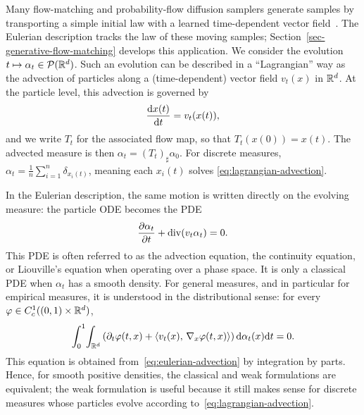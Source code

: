 Many flow-matching and probability-flow diffusion samplers generate samples by transporting a simple initial law with a learned time-dependent vector field~\cite{Lipman2022FlowMatching,Song2021ScoreSDE}. The Eulerian description tracks the law of these moving samples; Section~\ref{sec-generative-flow-matching} develops this application. We consider the evolution $t \mapsto \alpha_t \in \mathcal{P}(\mathbb{R}^d)$. Such an evolution can be described in a ``Lagrangian'' way as the advection of particles along a (time-dependent) vector field $v_t(x)$ in $\mathbb{R}^d$. At the particle level, this advection is governed by
\begin{equation}
    \frac{\mathrm{d} x(t)}{\mathrm{d} t} = v_t(x(t)), \label{eq:lagrangian-advection}
\end{equation}
and we write $T_t$ for the associated flow map, so that $T_t(x(0))=x(t)$. The advected measure is then $\alpha_t = (T_t)_\sharp \alpha_0$. For discrete measures, $\alpha_t = \frac{1}{n} \sum_{i=1}^n \delta_{x_i(t)}$, meaning each $x_i(t)$ solves \eqref{eq:lagrangian-advection}.

In the Eulerian description, the same motion is written directly on the evolving measure: the particle ODE becomes the PDE
\begin{equation}
    \frac{\partial \alpha_t}{\partial t} + \operatorname{div}(v_t \alpha_t) = 0. \label{eq:eulerian-advection}
\end{equation}
This PDE is often referred to as the advection equation, the continuity equation, or Liouville's equation when operating over a phase space. It is only a classical PDE when $\alpha_t$ has a smooth density. For general measures, and in particular for empirical measures, it is understood in the distributional sense: for every $\varphi\in C_c^1((0,1)\times\mathbb{R}^d)$,
\begin{equation}\label{eq:eulerian-advection-weak}
	\int_0^1\!\int_{\mathbb{R}^d}
	\left(\partial_t\varphi(t,x)+\langle v_t(x),\,\nabla_x\varphi(t,x)\rangle\right)
	\mathrm{d}\alpha_t(x)\mathrm{d} t
	=
	0.
\end{equation}
This equation is obtained from~\eqref{eq:eulerian-advection} by integration by parts. Hence, for smooth positive densities, the classical and weak formulations are equivalent; the weak formulation is useful because it still makes sense for discrete measures whose particles evolve according to~\eqref{eq:lagrangian-advection}.

